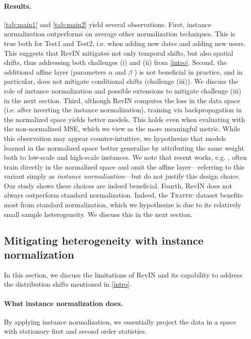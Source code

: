 



\paragraph{Results.}  \cref{tab:main1} and \cref{tab:main2} yield several observations. First, instance normalization outperforms on average other normalization techniques. This is true both for Test1 and Test2, i.e. when adding new dates and adding new users. This suggests that RevIN mitigates not only temporal shifts, but also spatial shifts, thus addressing both  challenges (i) and (ii) from \cref{intro}. Second, the additional affine layer (parameters $\alpha$ and $\beta$ ) is not beneficial in practice, and in particular, does not mitigate conditional shifts (challenge (iii)). We discuss the role of instance normalization and possible extensions to mitigate challenge (iii) in the next section. Third, although RevIN computes the loss in the data space (i.e. after inverting the instance normalization), training via backpropagation in the normalized space yields better models. This holds even when evaluating with the non-normalized MSE, which we view as the more meaningful metric. While this observation may appear counter-intuitive, we hypothesize that models learned in the normalized space better generalize by attributing the same weight both to low-scale and high-scale instances. We note that recent works, e.g. \citet{moirai}, often train directly in the normalized space and omit the affine layer---referring to this variant simply as \textit{instance normalization}---but do not justify this design choice. Our study shows these choices are indeed beneficial. Fourth, RevIN does not always outperform standard normalization. Indeed, the \textsc{Traffic} dataset benefits most from standard normalization, which we hypothesize is due to its relatively small sample heterogeneity. We discuss this in the next section.

\subsection{Mitigating heterogeneity with instance normalization} \label{qualitative}

In this section, we discuss the limitations of RevIN and its capability to address the distribution shifts mentioned in \cref{intro}.

\paragraph{What instance normalization does.} By applying instance normalization, we essentially project the data in a space with stationary first and second order statistics.

